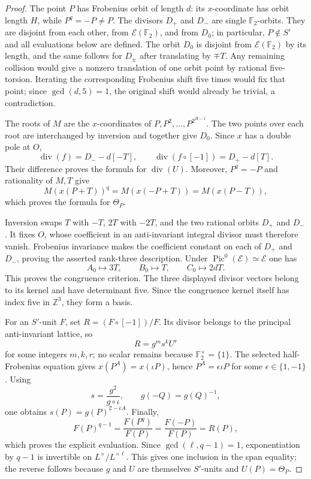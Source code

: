 \documentclass[11pt]{article}
\theoremstyle{definition}
\theoremstyle{remark}
\begin{document}
\begin{proof}
The point $P$ has Frobenius orbit of length $d$: its $x$-coordinate has orbit
length $H$, while $P^q=-P\ne P$.  The divisors $D_+$ and $D_-$ are single
$\mathbb F_2$-orbits.  They are disjoint from each other, from
$\mathcal E(\mathbb F_2)$, and from $D_0$; in particular, $P\notin S'$ and
all evaluations below are defined.  The orbit $D_0$ is disjoint from
$\mathcal E(\mathbb F_2)$ by its length, and the same follows for $D_\pm$
after translating by $\mp T$.  Any remaining collision would give a nonzero
translation of one orbit point by rational five-torsion.  Iterating the
corresponding Frobenius shift five times would fix that point; since
$\gcd(d,5)=1$, the original shift would already be trivial, a contradiction.

The roots of $M$ are the $x$-coordinates of
$P,P^2,\ldots,P^{2^{H-1}}$.  The two points over each root are interchanged by
inversion and together give $D_0$.  Since $x$ has a double pole at $O$,
\[
 \operatorname{div}(f)=D_--d[-T],\qquad
 \operatorname{div}(f\circ[-1])=D_+-d[T].
\]
Their difference proves the formula for $\operatorname{div}(U)$.  Moreover,
$P^q=-P$ and rationality of $M,T$ give
\[
 M(x(P+T))^q=M(x(-P+T))=M(x(P-T)),
\]
which proves the formula for $\Theta_P$.

Inversion swaps $T$ with $-T$, $2T$ with $-2T$, and the two rational orbits
$D_+$ and $D_-$.  It fixes $O$, whose coefficient in an anti-invariant
integral divisor must therefore vanish.  Frobenius invariance makes the
coefficient constant on each of $D_+$ and $D_-$, proving the asserted
rank-three description.  Under
$\operatorname{Pic}^0(\mathcal E)\simeq\mathcal E$ one has
\[
 A_0\longmapsto3T,\qquad B_0\longmapsto T,
 \qquad C_0\longmapsto2dT.
\]
This proves the congruence criterion.  The three displayed divisor vectors
belong to its kernel and have determinant five.  Since the congruence kernel
itself has index five in $\mathbb Z^3$, they form a basis.

For an $S'$-unit $F$, set $R=(F\circ[-1])/F$.  Its divisor belongs to the
principal anti-invariant lattice, so
\[
 R=g^m s^k U^r
\]
for some integers $m,k,r$; no scalar remains because
$\mathbb F_2^\times=\{1\}$.  The selected half-Frobenius equation gives
$x(P^A)=x(\iota P)$, hence $P^A=\epsilon\iota P$ for some
$\epsilon\in\{1,-1\}$.  Using
\[
 s=\frac{g^2}{g\circ\iota},\qquad g(-Q)=g(Q)^{-1},
\]
one obtains $s(P)=g(P)^{2-\epsilon A}$.  Finally,
\[
 F(P)^{q-1}=\frac{F(P^q)}{F(P)}
 =\frac{F(-P)}{F(P)}=R(P),
\]
which proves the explicit evaluation.  Since
$\gcd(\ell,q-1)=1$, exponentiation by $q-1$ is invertible on
$L^\times/L^{\times\ell}$.  This gives one inclusion in the span equality;
the reverse follows because $g$ and $U$ are themselves $S'$-units and
$U(P)=\Theta_P$.
\end{proof}
\end{document}
